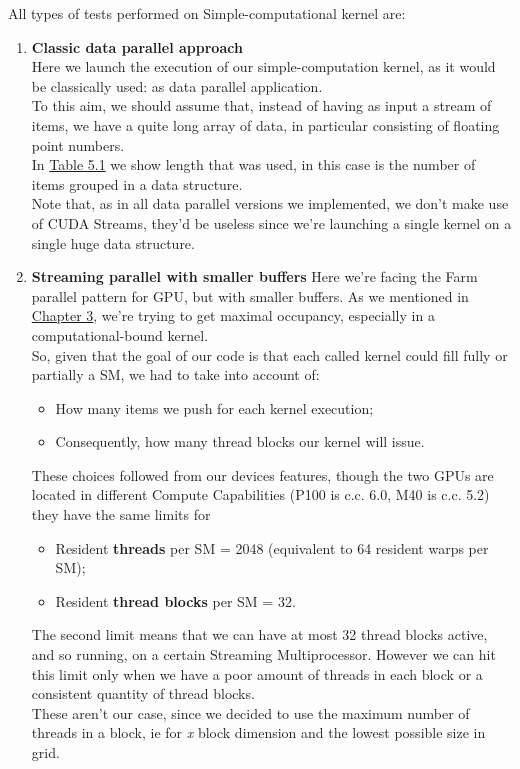 All types of tests performed on Simple-computational kernel are:
\begin{enumerate}
	\item \textbf{Classic data parallel approach}\\
		Here we launch the execution of our simple-computation kernel, as it would be classically used: as data parallel application.\\
		To this aim, we should assume that, instead of having as input a stream of items, we have a quite long array of data, in particular consisting of floating point numbers.\\
		In \hyperref[tab:cosdata]{Table 5.1} we show length that was used, in this case is the number of items grouped in a data structure.\\
		Note that, as in all data parallel versions we implemented, we don't make use of CUDA Streams, they'd be useless since we're launching a single kernel on a single huge data structure.

		
	\item \textbf{Streaming parallel with smaller buffers}
		Here we're facing the Farm parallel pattern for GPU, but with smaller buffers.
		As we mentioned in \hyperref[chap:logic]{Chapter 3}, we're trying to get maximal occupancy, especially in a computational-bound kernel.\\
		So, given that the goal of our code is that each called kernel  could fill fully or partially a SM, we had to take into account of: 
		\begin{itemize}
			\item How many items we push for each kernel execution;
			\item Consequently, how many thread blocks our kernel will issue.
		\end{itemize}
		These choices followed from our devices features, though the two GPUs are located in different Compute Capabilities (P100 is c.c. 6.0, M40 is c.c. 5.2) they have the same limits for 
		\begin{itemize}
			\item Resident \textbf{threads} per SM = 2048 (equivalent to 64 resident warps per SM);
			\item Resident \textbf{thread blocks} per SM = 32.
		\end{itemize}
		The second limit means that we can have at most 32 thread blocks active, and so running, on a certain Streaming Multiprocessor. However we can hit this limit only when we have a poor amount of threads in each block or a consistent quantity of thread blocks.\\
		These aren't our case, since we decided to use the maximum number of threads in a block, ie for \textit{x} block dimension and the lowest possible size in grid.
		

\end{enumerate}
